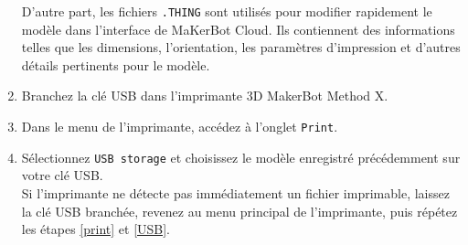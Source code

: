 \documentclass{Thesis}
\begin{document}
\begin{enumerate}
        D'autre part, les fichiers \texttt{.THING} sont utilisés pour modifier rapidement le modèle dans l'interface de MaKerBot Cloud. Ils contiennent des informations telles que les dimensions, l'orientation, les paramètres d'impression et d'autres détails pertinents pour le modèle.
    \item Branchez la clé USB dans l'imprimante 3D MakerBot Method X.
    \item \label{print}Dans le menu de l'imprimante, accédez à l'onglet \texttt{Print}.
    \item \label{USB}Sélectionnez \texttt{USB storage} et choisissez le modèle enregistré précédemment sur votre clé USB.\\
        Si l'imprimante ne détecte pas immédiatement un fichier imprimable, laissez la clé USB branchée, revenez au menu principal de l'imprimante, puis répétez les étapes \ref{print} et \ref{USB}.
\end{enumerate}
\end{document}
